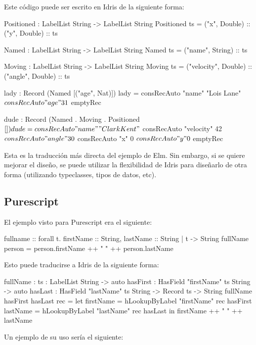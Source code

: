 Este código puede ser escrito en Idris de la siguiente forma:

\begin{code}
Positioned : LabelList String -> LabelList String 
Positioned ts = ("x", Double) :: ("y", Double) :: ts

Named : LabelList String -> LabelList String
Named ts = ("name", String) :: ts

Moving : LabelList String -> LabelList String
Moving ts = ("velocity", Double) :: ("angle", Double) :: ts

lady : Record (Named [("age", Nat)])
lady = consRecAuto "name" "Lois Lane" $
  consRecAuto "age" 31 $
  emptyRec  
      
dude : Record (Named . Moving . Positioned $ [])
dude = consRecAuto "name" "Clark Kent" $
  consRecAuto "velocity" 42 $
  consRecAuto "angle" 30 $
  consRecAuto "x" 0 $
  consRecAuto "y" 0 $
  emptyRec
\end{code}

Esta es la traducción más directa del ejemplo de Elm. Sin embargo, si se quiere mejorar el diseño, se puede utilizar la flexibilidad de Idris para diseñarlo de otra forma (utilizando typeclasses, tipos de datos, etc).

\subsection{Purescript}

El ejemplo visto para Purescript era el siguiente:

\begin{code}
fullname :: forall t. { firstName :: String, 
  lastName :: String | t } -> String 
fullName person = person.firstName ++ " " ++ person.lastName
\end{code}

Esto puede traducirse a Idris de la siguiente forma:

\begin{code}
fullName : {ts : LabelList String} -> 
  {auto hasFirst : HasField "firstName" ts String} -> 
  {auto hasLast : HasField "lastName" ts String} -> 
  Record ts -> String
fullName {hasFirst} {hasLast} rec =
  let firstName = hLookupByLabel "firstName" rec hasFirst
      lastName = hLookupByLabel "lastName" rec hasLast
  in firstName ++ " " ++ lastName
\end{code}

Un ejemplo de su uso sería el siguiente:


